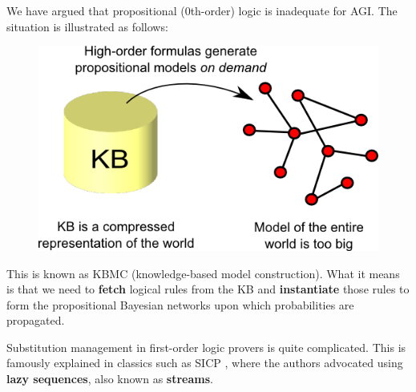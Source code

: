 We have argued that propositional (0th-order) logic is inadequate for AGI.  The situation is illustrated as follows:
\begin{figure}[H]
\centering
\includegraphics{KBMC-illustrated.png}
\end{figure}
This is known as KBMC (knowledge-based model construction).  What it means is that we need to \textbf{fetch} logical rules from the KB and \textbf{instantiate} those rules to form the propositional Bayesian networks upon which probabilities are propagated.

Substitution management in first-order logic provers is quite complicated.  This is famously explained in classics such as SICP \citep*{Abelson1984}, where the authors advocated using \textbf{lazy sequences}, also known as \textbf{streams}.

